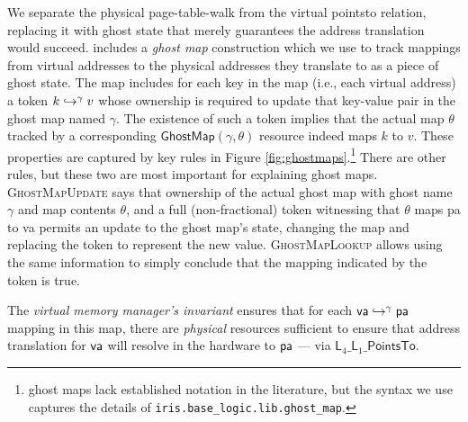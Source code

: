   We separate the physical page-table-walk  
  from the virtual pointsto relation, replacing it with ghost state that merely guarantees the address translation would succeed.
  \iris includes a \emph{ghost map} construction which we use to track mappings from
  virtual addresses to the physical addresses they translate to as a piece of ghost state.
  The map includes for each key in the map (i.e.,
  each virtual address) a token $k\hookrightarrow^{\gamma}v$ whose ownership is required to update that key-value pair in the ghost map
  named $\gamma$. The existence of such a token implies that the actual map $\theta$ tracked by a corresponding $\mathsf{GhostMap}(\gamma,\theta)$
  resource indeed maps $k$ to $v$. These properties are captured by key \iris rules in Figure \ref{fig:ghostmaps}.\footnote{\iris ghost maps lack established notation in the literature,
  but the syntax we use captures the details of \texttt{iris.base\_logic.lib.ghost\_map}.}
  There are other rules, but these two are most important for explaining ghost maps.
  \textsc{GhostMapUpdate} says that ownership of the actual ghost map with ghost name $\gamma$ and map contents $\theta$,
  and a full (non-fractional) token witnessing that $\theta$ maps \textsf{pa} to \textsf{va} permits an update to the ghost map's state,
  changing the map and replacing the token to represent the new value.
  \textsc{GhostMapLookup} allows using the same information to simply conclude that the mapping indicated by the token is true.
  
  The \emph{virtual memory manager's invariant} ensures that for each $\mathsf{va}\hookrightarrow^{\gamma}\textsf{pa}$ mapping
  in this map, there are \emph{physical} resources sufficient to ensure that address translation for $\mathsf{va}$
  will resolve in the hardware to $\textsf{pa}$ --- via $\textsf{L}_{4}\_\textsf{L}_{1}\_\textsf{PointsTo}$.


